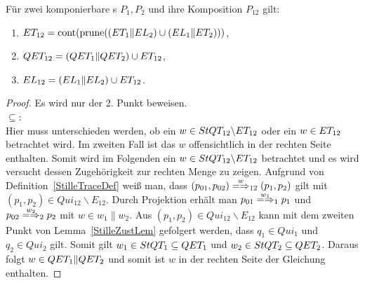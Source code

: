 \begin{Satz}
  \label{StilleSemSatz}
  Für zwei komponierbare \MEIO{}s $P_1,P_2$ und ihre Komposition $P_{12}$ gilt:
  \begin{enumerate}
    \item $ET _{12}=\mathrm{cont} (\mathrm{prune} ((ET _1\|EL _2)\cup (EL _1\|ET _2)))$,
    \item $QET _{12}=(QET _1\|QET _2)\cup ET _{12}$,
    \item $EL _{12}=(EL _1\|EL _2)\cup ET _{12}$.
  \end{enumerate}
\end{Satz}
\begin{proof}
  Es wird nur der 2. Punkt beweisen.\\
  \glqq$\subseteq$\grqq{}:\\
  Hier muss unterschieden werden, ob ein $w\in StQT _{12}\backslash ET _{12}$
  oder ein $w\in ET _{12}$ betrachtet wird. Im zweiten Fall ist das $w$
  offensichtlich in der rechten Seite enthalten. Somit wird im Folgenden ein
  $w\in StQT _{12}\backslash ET _{12}$ betrachtet und es wird versucht dessen
  Zugehörigkeit zur rechten Menge zu zeigen. Aufgrund von
  Definition~\ref{StilleTraceDef} weiß man, dass $(p_{01},p_{02})
  \weakmay[w]_{12} (p_1,p_2)$ gilt mit $(p_1,p_2)\in Qui_{12} \backslash
  E_{12}$. Durch Projektion erhält man $p_{01} \weakmay[w_1]_1 p_1$ und $p_{02}
  \weakmay[w_2]_2p_2$ mit $w\in w_1\|w_2$. Aus $(p_1,p_2)\in Qui_{12}
  \backslash E_{12}$ kann mit dem zweiten Punkt von Lemma~\ref{StilleZustLem}
  gefolgert werden, dass $q_1\in Qui_1$ und $q_2\in Qui_2$ gilt. Somit gilt
  $w_1 \in StQT _1\subseteq QET _1$ und $w_2\in StQT _2\subseteq QET _2$.
  Daraus folgt $w\in QET _1\|QET _2$ und somit ist $w$ in der rechten Seite
  der Gleichung enthalten.


\end{proof}
